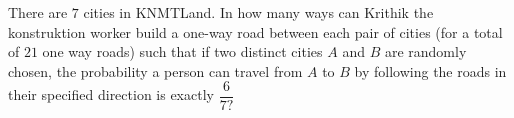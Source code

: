 There are $7$ cities in KNMTLand. In how many ways can Krithik the konstruktion worker build a one-way road between each pair of cities (for a total of $21$ one way roads) such that if two distinct cities $A$ and $B$ are randomly chosen, the probability a person can travel from $A$ to $B$ by following the roads in their specified direction is exactly $\dfrac{6}{7 ?}$
